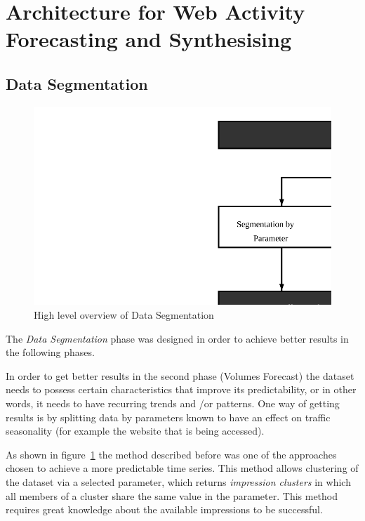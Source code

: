 \section{Architecture for Web Activity Forecasting and Synthesising}

\subsection{Data Segmentation}\label{subsec:seg}

\begin{figure}[h] \begin{center} \leavevmode
\includegraphics[]{segmentation} \caption{ High level overview
of Data Segmentation} \label{fig:segmentation_arch} \end{center} \end{figure}

The \emph{Data Segmentation} phase was designed in order to achieve better
results in the following phases. 

In order to get better results in the second phase (Volumes Forecast) the dataset needs to possess
certain characteristics that improve its predictability, or in other words, it
needs to have recurring trends and /or patterns.
One way of getting results is by splitting data by parameters known to have an
effect on traffic seasonality (for example the website that is being accessed).

As shown in figure~\ref{fig:segmentation_arch} the method described before was
one of the approaches chosen to achieve a more predictable time series.
This method allows clustering of the dataset via a selected parameter, which
returns \emph{impression clusters} in which all members of a cluster share the
same value in the parameter. This method requires great knowledge about the
available impressions to be successful.

